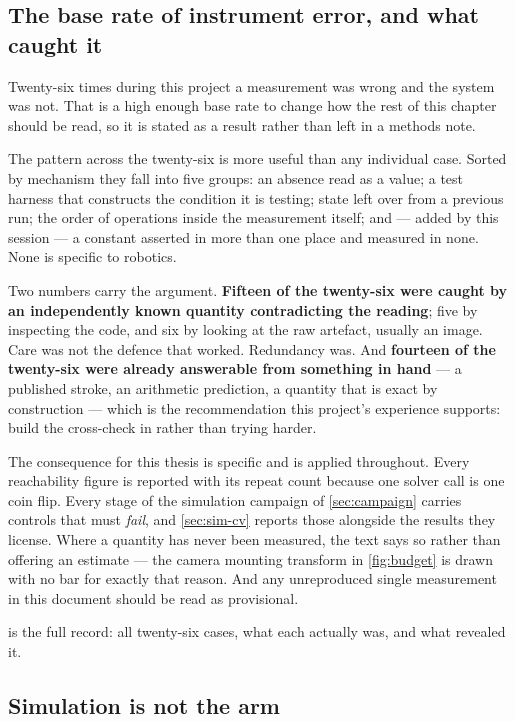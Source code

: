\subsection{The base rate of instrument error, and what caught it}

Twenty-six times during this project a measurement was wrong and the system
was not. That is a high enough base rate to change how the rest of this
chapter should be read, so it is stated as a result rather than left in a
methods note.

The pattern across the twenty-six is more useful than any individual case.
Sorted by mechanism they fall into five groups: an absence read as a value; a
test harness that constructs the condition it is testing; state left over from
a previous run; the order of operations inside the measurement itself; and ---
added by this session --- a constant asserted in more than one place and
measured in none. None is specific to robotics.

Two numbers carry the argument. \textbf{Fifteen of the twenty-six were caught
by an independently known quantity contradicting the reading}; five by
inspecting the code, and six by looking at the raw artefact, usually an image.
Care was not the defence that worked. Redundancy was. And \textbf{fourteen of
the twenty-six were already answerable from something in hand} --- a
published stroke, an arithmetic prediction, a quantity that is exact by
construction --- which is the recommendation this project's experience
supports: build the cross-check in rather than trying harder.

The consequence for this thesis is specific and is applied throughout. Every
reachability figure is reported with its repeat count because one solver call
is one coin flip. Every stage of the simulation campaign of
\cref{sec:campaign} carries controls that must \emph{fail}, and
\cref{sec:sim-cv} reports those alongside the results they license. Where a
quantity has never been measured, the text says so rather than offering an
estimate --- the camera mounting transform in \cref{fig:budget} is drawn with
no bar for exactly that reason. And any unreproduced single measurement in
this document should be read as provisional.

 is the full record: all twenty-six cases, what each
actually was, and what revealed it.

\subsection{Simulation is not the arm}

